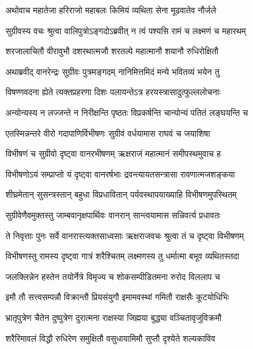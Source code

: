 
\twolineshloka
{अथोवाच महातेजा हरिराजो महाबलः}
{किमियं व्यथिता सेना मूढवातेव नौर्जले} %

\twolineshloka
{सुग्रीवस्य वचः श्रुत्वा वालिपुत्रोऽङ्गदोऽब्रवीत्}
{न त्वं पश्यसि रामं च लक्ष्मणं च महारथम्} %

\twolineshloka
{शरजालाचितौ वीरावुभौ दशरथात्मजौ}
{शरतल्पे महात्मानौ शयानौ रुधिरोक्षितौ} %

\twolineshloka
{अथाब्रवीद् वानरेन्द्रः सुग्रीवः पुत्रमङ्गदम्}
{नानिमित्तमिदं मन्ये भवितव्यं भयेन तु} %

\twolineshloka
{विषण्णवदना ह्येते त्यक्तप्रहरणा दिशः}
{पलायन्तेऽत्र हरयस्त्रासादुत्फुल्ललोचनाः} %

\twolineshloka
{अन्योन्यस्य न लज्जन्ते न निरीक्षन्ति पृष्ठतः}
{विप्रकर्षन्ति चान्योन्यं पतितं लङ्घयन्ति च} %

\twolineshloka
{एतस्मिन्नन्तरे वीरो गदापाणिर्विभीषणः}
{सुग्रीवं वर्धयामास राघवं च जयाशिषा} %

\twolineshloka
{विभीषणं च सुग्रीवो दृष्ट्वा वानरभीषणम्}
{ऋक्षराजं महात्मानं समीपस्थमुवाच ह} %

\twolineshloka
{विभीषणोऽयं सम्प्राप्तो यं दृष्ट्वा वानरर्षभाः}
{द्रवन्त्यायतसन्त्रासा रावणात्मजशङ्कया} %

\twolineshloka
{शीघ्रमेतान् सुसन्त्रस्तान् बहुधा विप्रधावितान्}
{पर्यवस्थापयाख्याहि विभीषणमुपस्थितम्} %

\twolineshloka
{सुग्रीवेणैवमुक्तस्तु जाम्बवानृक्षपार्थिवः}
{वानरान् सान्त्वयामास सन्निवर्त्य प्रधावतः} %

\twolineshloka
{ते निवृत्ताः पुनः सर्वे वानरास्त्यक्तसाध्वसाः}
{ऋक्षराजवचः श्रुत्वा तं च दृष्ट्वा विभीषणम्} %

\twolineshloka
{विभीषणस्तु रामस्य दृष्ट्वा गात्रं शरैश्चितम्}
{लक्ष्मणस्य तु धर्मात्मा बभूव व्यथितस्तदा} %

\twolineshloka
{जलक्लिन्नेन हस्तेन तयोर्नेत्रे विमृज्य च}
{शोकसम्पीडितमना रुरोद विललाप च} %

\twolineshloka
{इमौ तौ सत्त्वसम्पन्नौ विक्रान्तौ प्रियसंयुगौ}
{इमामवस्थां गमितौ राक्षसैः कूटयोधिभिः} %

\twolineshloka
{भ्रातृपुत्रेण चैतेन दुष्पुत्रेण दुरात्मना}
{राक्षस्या जिह्मया बुद्ध्या वञ्चितावृजुविक्रमौ} %

\twolineshloka
{शरैरिमावलं विद्धौ रुधिरेण समुक्षितौ}
{वसुधायामिमौ सुप्तौ दृश्येते शल्यकाविव} %


